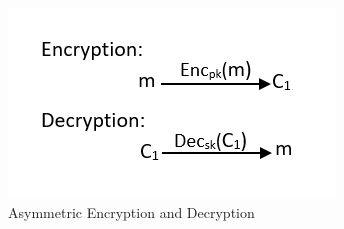 \begin{figure}[H]
\centering
\includegraphics[scale=0.8]{figures/asym.PNG}
\caption{Asymmetric Encryption and Decryption}
\label{fig:Asymmetric Encryption}
\end{figure}